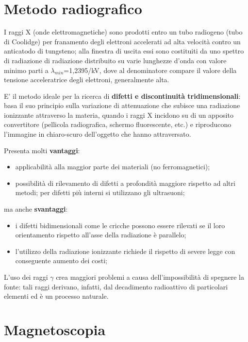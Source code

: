 \section{Metodo radiografico}

I raggi X (onde elettromagnetiche) sono prodotti entro un tubo radiogeno (tubo di Coolidge) per franamento degli elettroni accelerati ad alta velocità contro un anticatodo di tungsteno; alla finestra di uscita essi sono costituiti da uno spettro di radiazione di radiazione distribuito su varie lunghezze d’onda con valore minimo parti a $\lambda_{min}$=1,2395/kV, dove al denominatore compare il valore della tensione acceleratrice degli elettroni, generalmente alta.

E’ il metodo ideale per la ricerca di \textbf{difetti e discontinuità tridimensionali}: basa il suo principio sulla variazione di attenuazione che subisce una radiazione ionizzante attraverso la materia, quando i raggi X incidono su di un apposito convertitore (pellicola radiografica, schermo fluorescente, etc.) e riproducono l’immagine in chiaro-scuro dell’oggetto che hanno attraversato.

Presenta molti \textbf{vantaggi}:
\begin{itemize}
    \item applicabilità alla maggior parte dei materiali (no ferromagnetici);
    \item possibilità di rilevamento di difetti a profondità maggiore rispetto ad altri metodi; per difetti più
interni si utilizzano gli ultrasuoni;
\end{itemize}

ma anche \textbf{svantaggi}:
\begin{itemize}
    \item i difetti bidimensionali come le cricche possono essere rilevati se il loro orientamento rispetto all’asse della radiazione è parallelo;
    \item l’utilizzo della radiazione ionizzante richiede il rispetto di severe legge con conseguente aumento dei costi;
\end{itemize}

L’uso dei raggi $\gamma$ crea maggiori problemi a causa dell’impossibilità di spegnere la fonte: tali raggi derivano, infatti, dal decadimento radioattivo di particolari elementi ed è un processo naturale.

\section{Magnetoscopia}

